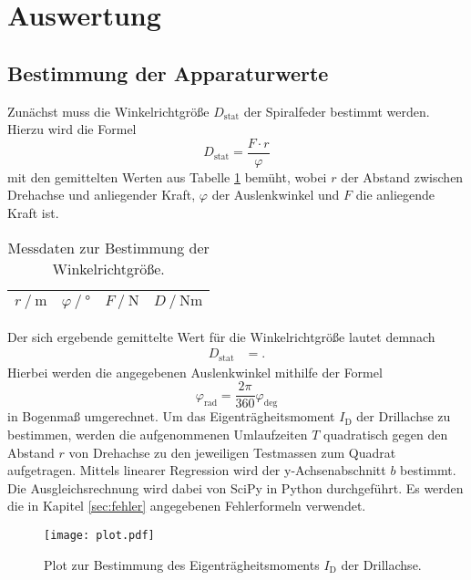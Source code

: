 \section{Auswertung}
\label{sec:Auswertung}

\subsection{Bestimmung der Apparaturwerte}

Zunächst muss die Winkelrichtgröße $D_\text{stat}$ der Spiralfeder bestimmt werden.
Hierzu wird die Formel
\begin{equation}
  D_\text{stat} = \frac{F \cdot r}{\varphi}
\end{equation}
mit den gemittelten Werten aus Tabelle \ref{tab:1} bemüht, wobei $r$ der Abstand zwischen Drehachse und anliegender Kraft, $\varphi$ der Auslenkwinkel und $F$ die anliegende Kraft ist.

\begin{table}[H]
  \centering
  \caption{Messdaten zur Bestimmung der Winkelrichtgröße.}
  \label{tab:1}
  \begin{tabular}{c c c c}
    \toprule
    {$r \ /\ \si{\metre}$} & {$\varphi \ /\ \si{\degree}$} & {$F \ /\ \si{\newton}$} & {$D \ /\ \si{\newton\metre}$}\\
    \midrule
    
    \bottomrule
  \end{tabular}
\end{table}

Der sich ergebende gemittelte Wert für die Winkelrichtgröße lautet demnach
\begin{align*}
  D_\text{stat}   &=   .
\end{align*}
Hierbei werden die angegebenen Auslenkwinkel mithilfe der Formel
\begin{equation}
  \varphi_\text{rad} = \frac{2 \pi}{360} \varphi_\text{deg}
\end{equation}
in Bogenmaß umgerechnet.
Um das Eigenträgheitsmoment $I_{\text{D}}$ der Drillachse zu bestimmen, werden die aufgenommenen Umlaufzeiten $T$ quadratisch gegen den Abstand $r$ von Drehachse zu den jeweiligen Testmassen zum Quadrat aufgetragen.
Mittels linearer Regression wird der y-Achsenabschnitt $b$ bestimmt.
Die Ausgleichsrechnung wird dabei von SciPy in Python durchgeführt.
Es werden die in Kapitel \ref{sec:fehler} angegebenen Fehlerformeln verwendet.

\begin{figure}
  \centering
  \texttt{[image: plot.pdf]}
  \caption{Plot zur Bestimmung des Eigenträgheitsmoments $I_{\text{D}}$ der Drillachse.}
  \label{fig:plot}
\end{figure}

